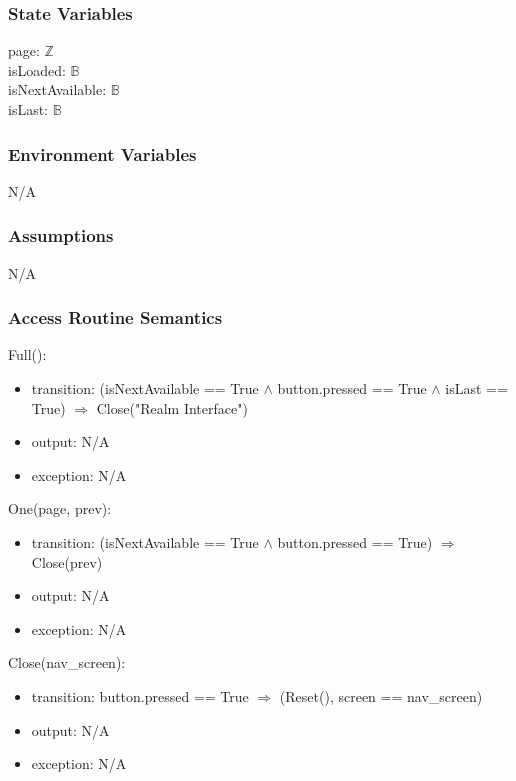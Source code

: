 \documentclass[12pt, titlepage]{article}
\begin{document}
\subsubsection{State Variables}

page: $\mathbb{Z}$\\
isLoaded: $\mathbb{B}$\\
isNextAvailable: $\mathbb{B}$\\
isLast: $\mathbb{B}$

\subsubsection{Environment Variables}

N/A

\subsubsection{Assumptions}

N/A

\subsubsection{Access Routine Semantics}

\noindent Full():
\begin{itemize}
\item transition: (isNextAvailable == True $\wedge$ button.pressed == True $\wedge$ isLast == True) $\Rightarrow$ Close("Realm Interface")
\item output: N/A
\item exception: N/A
\end{itemize}

\noindent One(page, prev):
\begin{itemize}
\item transition: (isNextAvailable == True $\wedge$ button.pressed == True) $\Rightarrow$ Close(prev)
\item output: N/A
\item exception: N/A
\end{itemize}

\noindent Close(nav\_screen):
\begin{itemize}
\item transition: button.pressed == True $\Rightarrow$ (Reset(), screen == nav\_screen)
\item output: N/A
\item exception: N/A
\end{itemize}
\end{document}
